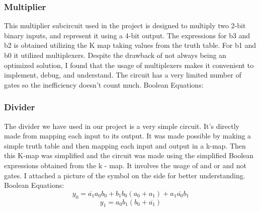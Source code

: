 \documentclass[a4paper,10pt]{article}
\begin{document}
\subsubsection{Multiplier}
This multiplier subcircuit used in the project is designed to multiply two 2-bit binary inputs, and represent it using a 4-bit output. The expressions for b3 and b2 is obtained utilizing the K map taking values from the truth table. For b1 and b0 it utilized multiplexers. Despite the drawback of not always being an optimized solution, I found that the usage of multiplexers makes it convenient to implement, debug, and understand. The circuit has a very limited number of gates so the inefficiency doesn’t count much.\newline\newline
Boolean Equations:\newline 


\subsubsection{Divider}
The divider we have used in our project is a very simple circuit. It’s directly made from mapping each input to its output. It was made possible by making a simple truth table and then mapping each input and output in a k-map. Then this K-map was simplified and the circuit was made using the simplified Boolean expressions obtained from the k - map. It involves the usage of and or and not gates. I attached a picture of the symbol on the side for better understanding.\newline\newline
Boolean Equations:\newline 
\hspace*{4.5cm}\[ y_0 = \overline{a_1}a_0b_0 + b_1b_0(a_0 + a_1) + a_1\overline{a_0}b_1 \]
\hspace*{4.5cm}\[ y_1 = a_0b_1(b_0 + \overline{a_1}) \]
\end{document}
